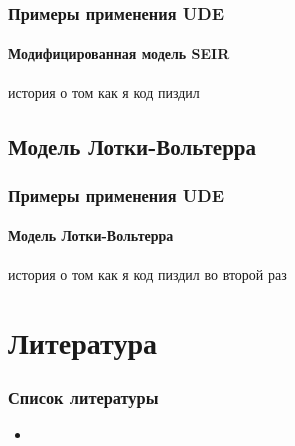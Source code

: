 \documentclass[10pt,pdf,hyperref={unicode}]{beamer}
\begin{document}
			\begin{frame}
				\frametitle{Примеры применения UDE} 
				\framesubtitle{Модифицированная модель SEIR}
					история о том как я код пиздил  
			\end{frame}
			
			
		\subsection{Модель Лотки-Вольтерра}
			
			\begin{frame}
				\frametitle{Примеры применения UDE} 
				\framesubtitle{Модель Лотки-Вольтерра}
					история о том как я код пиздил  во второй раз
			\end{frame}
		
		
	\section*{Литература}
	
		\begin{frame}
			\frametitle{Список литературы} 
				\begin{itemize}
					\item
				\end{itemize}
			
		\end{frame}
\end{document}
